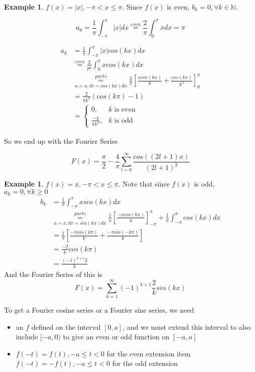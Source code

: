\documentclass[12pt]{article}
\theoremstyle{plain}
\theoremstyle{definition}
\newtheorem{example}[theorem]{Example}
\begin{document}
\begin{example}
    $f(x) = |x|, -\pi < x \leq \pi$. Since $f(x)$ is even, $b_k=0, \forall k\in\mathbb{N}$.
    
    $$a_0 = \frac{1}{\pi} \int^\pi_{-\pi} |x|dx \overset{even}{=} \frac{2}{\pi} \int^\pi_0 x dx= \pi$$
    
   \begin{align*}
   	a_k &= \frac{1}{\pi} \int^\pi_{-\pi} |x| cos(kx) dx\\
	&\overset{even}{=} \frac{2}{pi} \int^\pi_0 x cos(kx) dx\\
	&\underset{u=x, dv=cos(kx)dx}{\overset{parts}{=}} \frac{2}{\pi} [\frac{x sin(kx)}{k} + \frac{cos(kx)}{k^2}]^\pi_0\\
	&= \frac{2}{\pi k^2} (cos(k\pi) - 1)\\
	&=\begin{cases}
		0, &\text{$k$ is even}\\
		\frac{-4}{\pi k^2}, &\text{$k$ is odd}
	\end{cases}
   \end{align*}
   
   So we end up with the Fourier Series
   
   $$F(x) = \frac{\pi}{2} - \frac{4}{\pi} \sum^\infty_{l=0} \frac{cos((2l+1)x)}{(2l+1)^2}$$

\end{example}

\begin{example}
	$f(x) = x, -\pi < x \leq \pi$. Note that since $f(x)$ is odd, $a_k = 0, \forall k \geq 0$
	\begin{align*}
		b_k &= \frac{1}{\pi} \int^\pi_{-\pi} x sin(kx) dx\\
		&\underset{u=x, dv=sin(kx)dx}{\overset{parts}{=}} \frac{1}{\pi} [\frac{-xcos(kx)}{k}]^\pi_{-\pi} + \frac{1}{\pi} \int^\pi_{-\pi} cos(kx) dx\\
		&= \frac{1}{\pi} [\frac{-\pi cos(k\pi)}{k} + \frac{-\pi cos(-k\pi)}{k}]\\
		&= \frac{-2}{k} cos(k\pi)\\
		&= \frac{(-1)^{k+1} 2}{k}
	\end{align*}
	And the Fourier Series of this is
	$$F(x) = \sum^\infty_{k=1} (-1)^{k+1} \frac{2}{k} sin(kx)$$
\end{example}

To get a Fourier cosine series or a Fourier sine series, we need
\begin{itemize}
	\item{an $f$ defined on the interval $[0,a]$, and we must extend this interval to also include $[-a,0)$ to give an even or odd function on $[-a,a]$}
	\item{$f(-t)=f(t), -a\leq t < 0$ for the even extension}
	item{$f(-t)=-f(t), -a\leq t < 0$ for the odd extension}
\end{itemize}
\end{document}
